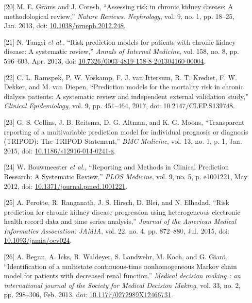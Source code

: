 \documentclass[
]{article}
\newenvironment{cslreferences}%
  {}%
  {\par}
\begin{document}
\begin{cslreferences}
\leavevmode\hypertarget{ref-grams_assessing_2013}{}%
{[}20{]} M. E. Grams and J. Coresh, ``Assessing risk in chronic kidney disease: A methodological review,'' \emph{Nature Reviews. Nephrology}, vol. 9, no. 1, pp. 18--25, Jan. 2013, doi: \href{https://doi.org/10.1038/nrneph.2012.248}{10.1038/nrneph.2012.248}.

\leavevmode\hypertarget{ref-tangri_risk_2013}{}%
{[}21{]} N. Tangri \emph{et al.}, ``Risk prediction models for patients with chronic kidney disease: A systematic review,'' \emph{Annals of Internal Medicine}, vol. 158, no. 8, pp. 596--603, Apr. 2013, doi: \href{https://doi.org/10.7326/0003-4819-158-8-201304160-00004}{10.7326/0003-4819-158-8-201304160-00004}.

\leavevmode\hypertarget{ref-ramspek_prediction_2017}{}%
{[}22{]} C. L. Ramspek, P. W. Voskamp, F. J. van Ittersum, R. T. Krediet, F. W. Dekker, and M. van Diepen, ``Prediction models for the mortality risk in chronic dialysis patients: A systematic review and independent external validation study,'' \emph{Clinical Epidemiology}, vol. 9, pp. 451--464, 2017, doi: \href{https://doi.org/10.2147/CLEP.S139748}{10.2147/CLEP.S139748}.

\leavevmode\hypertarget{ref-collins_transparent_2015}{}%
{[}23{]} G. S. Collins, J. B. Reitsma, D. G. Altman, and K. G. Moons, ``Transparent reporting of a multivariable prediction model for individual prognosis or diagnosis (TRIPOD): The TRIPOD Statement,'' \emph{BMC Medicine}, vol. 13, no. 1, p. 1, Jan. 2015, doi: \href{https://doi.org/10.1186/s12916-014-0241-z}{10.1186/s12916-014-0241-z}.

\leavevmode\hypertarget{ref-bouwmeester_reporting_2012-1}{}%
{[}24{]} W. Bouwmeester \emph{et al.}, ``Reporting and Methods in Clinical Prediction Research: A Systematic Review,'' \emph{PLOS Medicine}, vol. 9, no. 5, p. e1001221, May 2012, doi: \href{https://doi.org/10.1371/journal.pmed.1001221}{10.1371/journal.pmed.1001221}.

\leavevmode\hypertarget{ref-perotte_risk_2015}{}%
{[}25{]} A. Perotte, R. Ranganath, J. S. Hirsch, D. Blei, and N. Elhadad, ``Risk prediction for chronic kidney disease progression using heterogeneous electronic health record data and time series analysis,'' \emph{Journal of the American Medical Informatics Association: JAMIA}, vol. 22, no. 4, pp. 872--880, Jul. 2015, doi: \href{https://doi.org/10.1093/jamia/ocv024}{10.1093/jamia/ocv024}.

\leavevmode\hypertarget{ref-begun_identification_2013}{}%
{[}26{]} A. Begun, A. Icks, R. Waldeyer, S. Landwehr, M. Koch, and G. Giani, ``Identification of a multistate continuous-time nonhomogeneous Markov chain model for patients with decreased renal function.'' \emph{Medical decision making : an international journal of the Society for Medical Decision Making}, vol. 33, no. 2, pp. 298--306, Feb. 2013, doi: \href{https://doi.org/10.1177/0272989X12466731}{10.1177/0272989X12466731}.


\end{cslreferences}
\end{document}
